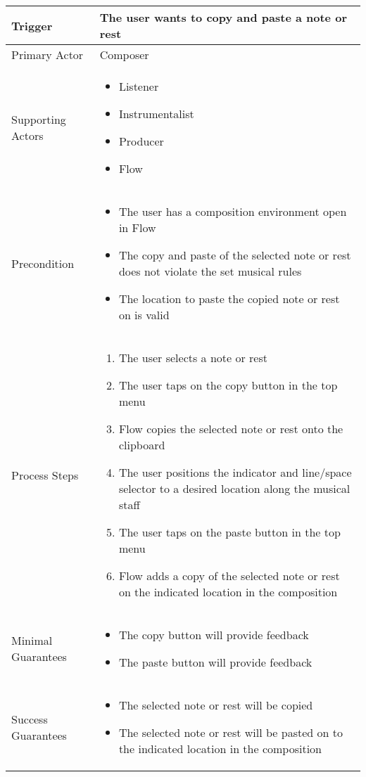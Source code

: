 \begin{longtable}{|X|X|}
\hline
Trigger & 
The user wants to copy and paste a note or rest\\
\hline
Primary Actor & 
Composer \\
\hline
Supporting Actors & 
\begin{itemize}
\item Listener
\item Instrumentalist
\item Producer
\item Flow
\end{itemize} \\
\hline
Precondition & 
\begin{itemize}
\item The user has a composition environment open in Flow
\item The copy and paste of the selected note or rest does not violate the set musical rules
\item The location to paste the copied note or rest on is valid
\end{itemize} \\
\hline
Process Steps & 
\begin{enumerate}
\item The user selects a note or rest
\item The user taps on the copy button in the top menu
\item Flow copies the selected note or rest onto the clipboard
\item The user positions the indicator and line/space selector to a desired location along the musical staff
\item The user taps on the paste button in the top menu
\item Flow adds a copy of the selected note or rest on the indicated location in the composition
\end{enumerate} \\
\hline
Minimal Guarantees & 
\begin{itemize}
  \item The copy button will provide feedback
  \item The paste button will provide feedback
\end{itemize} \\
\hline
Success Guarantees & 
\begin{itemize}
  \item The selected note or rest will be copied
  \item The selected note or rest will be pasted on to the indicated location in the composition
\end{itemize} \\
\hline
\end{longtable}